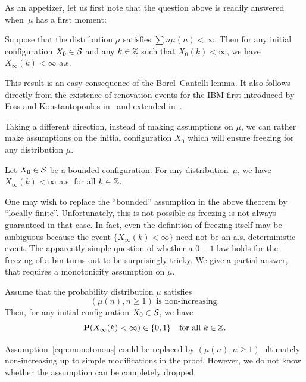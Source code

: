 \documentclass[AHL,Unicode,longabstracts,published]{cedram}
\newcommand{\Z}{\mathbb{Z}}
\renewcommand{\P}{\mathbf{P}}
\renewcommand{\S}{\mathcal{S}}
\let\oldin\in
\renewcommand{\in}{\mathchoice{\oldin}{\oldin}{\,\oldin\,}{\,\oldin\,}}
\newcommand{\Z}{\mathbb{Z}}
\begin{document}
As an appetizer, let us first note that the question above is readily answered when~$\mu$ has a first moment:
\begin{prop}\label{prop:strongFreezing}
Suppose that the distribution $\mu$ satisfies $\sum n\mu(n) < \infty.$ Then for any initial configuration $X_0 \in \S$ and any $k\in\Z$ such that $X_0(k) < \infty$, we have $X_\infty(k) < \infty$ a.s.
\end{prop}

This result is an easy consequence of the Borel--Cantelli  lemma. It also follows directly from the existence of renovation events for the IBM first introduced by Foss and Konstantopoulos in~\cite{FK} and extended in~\cite{CR, FZ}.


Taking a different direction, instead of making assumptions on $\mu$, we can rather make assumptions on the initial configuration $X_0$ which will ensure freezing for any distribution $\mu$.

\begin{theo}\label{thm:unifbounded}
Let $X_0 \in \S$ be a bounded configuration. For any distribution~$\mu$, we have $X_\infty(k) < \infty$ a.s. for all $k\in \Z$.
\end{theo}

One may wish to replace the ``bounded'' assumption in the above theorem by ``locally finite''. Unfortunately, this is not possible as freezing is not always guaranteed in that case. In fact, even the definition of freezing itself may be ambiguous because the event $\{ X_\infty(k) < \infty\}$ need not be an a.s. deterministic event. The apparently simple question of whether a $0-1$ law holds for the freezing of a bin turns out to be surprisingly tricky. We give a partial answer, that requires a monotonicity assumption on $\mu$.
\begin{theo}\label{thm:01law}
Assume that the probability distribution $\mu$ satisfies
\begin{equation}\label{eqn:monotonous}
\text{$(\mu(n), n \geq 1)$ is non-increasing.}
\end{equation}
Then, for any initial configuration $X_0 \in \S$, we have
\[
\P(X_\infty(k) < \infty) \in \{0,1\} \quad \text{for all $k\in \Z$.}
\]
\end{theo}

\begin{rema}
Assumption~\eqref{eqn:monotonous} could be replaced by $(\mu(n), n\geq 1)$ ultimately non-increasing up to simple modifications in the proof. However, we do not know whether the assumption can be completely dropped.
\end{rema}
\end{document}
